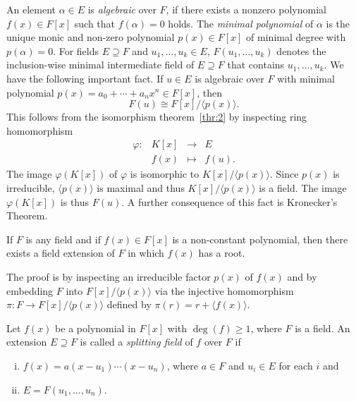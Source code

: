 An element $α∈ E$ is \emph{algebraic} over $F$, if there exists a nonzero polynomial $f(x) ∈ F[x]$  such that $f(α)= 0 $ holds. The \emph{minimal polynomial} of $α$ is the unique monic and non-zero polynomial $p(x) ∈ F[x] $ of minimal degree with $p(α)=0$. For fields $E ⊇ F$ and $u_1,\dots,u_k ∈E$, $F(u_1,\dots,u_k)$ denotes the inclusion-wise minimal intermediate field of $E⊇F$ that contains $u_1,\dots,u_k$. We have the following important fact. If $u ∈E$ is algebraic over $F$ with minimal polynomial $p(x) = a_0+ \cdots + a_n x^n ∈F[x]$, then
\begin{equation}
  \label{eq:8}
  F(u) ≅ F[x] / 〈p(x)〉.  
\end{equation}
This follows from the isomorphism theorem~\ref{thr:2} by inspecting  ring homomorphism
\begin{equation}
  \label{eq:10}
  \begin{array}{rccc}
    φ: & K[x] &→&  E \\
       &  f(x) & ↦ & f(u). 
  \end{array}
\end{equation}
The image $φ(K[x])$ of $φ$ is isomorphic to $ K[x] / 〈p(x)〉$. Since $p(x)$ is irreducible, $〈p(x)〉$ is maximal and thus $ K[x] / 〈p(x)〉$ is a field. The image $φ(K[x])$ is thus $F(u)$. A further consequence of this fact is Kronecker's Theorem.
\begin{theorem}
  \label{thr:11}
  If $F$ is any field and if $f(x) ∈ F[x]$ is a non-constant polynomial, then there exists a field extension of $F$ in which $f(x)$ has a root. 
\end{theorem}
The proof is by inspecting an irreducible factor $p(x)$ of $f(x)$ and by embedding $F$ into $F[x] / 〈p(x)〉$ via the injective homomorphism $π: F →F[x] / 〈p(x)〉$  defined by  $π(r) = r + 〈f(x)〉$.


\begin{definition}
  \label{def:1}
  Let $f(x)$ be a polynomial in $F[x]$ with $\deg(f) ≥1$, where $F$ is a field. An extension $E ⊇F$ is called a \emph{splitting field} of $f$ over $F$ if
  \begin{enumerate}[i)]
  \item  $f(x) = a (x-u_1) \cdots (x - u_n)$, where $a ∈F$ and $u_i ∈E$ for each $i$ and
  \item $E = F(u_1,\dots,u_n)$. 
  \end{enumerate}
\end{definition}

